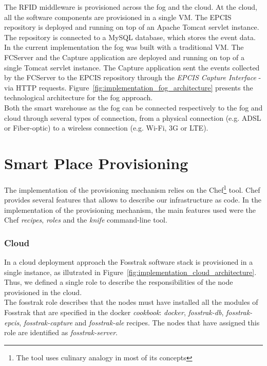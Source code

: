 The \gls{RFID} middleware is provisioned across the fog and the cloud. At the cloud,
all the software components are provisioned in a single \gls{VM}. The \gls{EPCIS} repository is deployed
and running on top of an Apache Tomcat servlet instance. The repository is connected to a MySQL
database, which stores the event data. In the current implementation the fog was built with a traditional
\gls{VM}. The \gls{FCServer} and the Capture application are deployed and running on top of a single
Tomcat servlet instance. The Capture application sent the events collected by the \gls{FCServer} to
the \gls{EPCIS} repository through the \textit{\gls{EPCIS} Capture Interface} - via \gls{HTTP} requests.
Figure~\ref{fig:implementation_fog_architecture} presents the technological architecture for the fog
approach.\\

Both the smart warehouse as the fog can be connected respectively to the fog and cloud through several
types of connection, from a physical connection (e.g. \gls{ADSL} or Fiber-optic) to a wireless connection
(e.g. Wi-Fi, 3G or \gls{LTE}).

\section{Smart Place Provisioning}
\label{sec:impl_provisioning}
The implementation of the provisioning mechanism relies on the Chef\footnote{The tool uses culinary
analogy in most of its concepts} tool. Chef provides several features that allows to describe our
infrastructure as code. In the implementation of the provisioning mechanism, the main features used
were the Chef \textit{recipes}, \textit{roles} and the \textit{knife} command-line tool.

\subsubsection{Cloud}
\label{sub:cloud_provisioning}
In a cloud deployment approach the Fosstrak software stack is provisioned in a single instance, as
illutrated in Figure~\ref{fig:implementation_cloud_architecture}. Thus, we defined a single role
to describe the responsibilities of the node provisioned in the cloud.\\

The fosstrak role describes that the nodes must have installed all the modules of Fosstrak
that are specified in the docker \textit{cookbook}: \textit{docker}, \textit{fosstrak-db},
\textit{fosstrak-epcis}, \textit{fosstrak-capture} and \textit{fosstrak-ale} recipes. The nodes
that have assigned this role are identified as \textit{fosstrak-server}.


